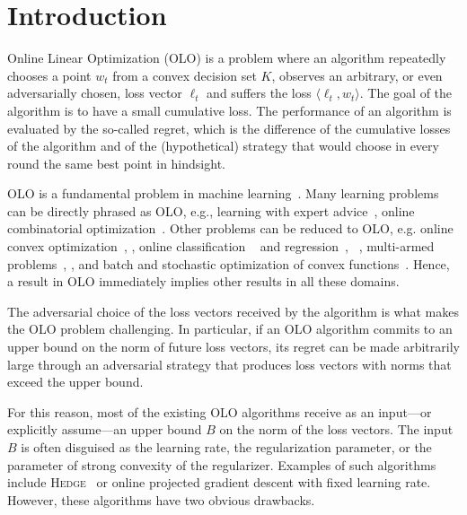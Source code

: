 \section{Introduction}
\label{section:introduction}

Online Linear Optimization (OLO) is a problem where an algorithm repeatedly
chooses a point $w_t$ from a convex decision set $K$, observes an arbitrary, or
even adversarially chosen, loss vector $\ell_t$ and suffers the loss $\langle
\ell_t, w_t \rangle$.  The goal of the algorithm is to have a small cumulative
loss. The performance of an algorithm is evaluated by the so-called regret,
which is the difference of the cumulative losses of the algorithm and of the
(hypothetical) strategy that would choose in every round the same best point in
hindsight.

OLO is a fundamental problem in machine
learning~\cite{Cesa-Bianchi-Lugosi-2006, Rakhlin-Sridharan-2009,
Shalev-Shwartz-2011}.  Many learning problems can be directly phrased as OLO,
e.g., learning with expert advice~\cite{Littlestone-Warmuth-1994, Vovk-1998,
Freund-Schapire-1997, Cesa-Bianchi-Haussler-Helmbold-Schapire-Warmuth-1997},
online combinatorial optimization~\cite{Kalai-Vempala-2005,
Helmbold-Warmuth-2009, Koolen-Warmuth-Kivinen-2010}. Other problems can be
reduced to OLO, e.g. online convex
optimization~\cite{Abernethy-Bartlett-Rakhlin-Tewari-2008},
\cite[Chapter~2]{Shalev-Shwartz-2011}, online classification
~\cite{Rosenblatt-1958, Freund-Schapire-1999} and
regression~\cite{Kivinen-Warmuth-1997},
~\cite[Chapters~11~and~12]{Cesa-Bianchi-Lugosi-2006}, multi-armed
problems~\cite[Chapter~6]{Cesa-Bianchi-Lugosi-2006},
\cite{Abernethy-Hazan-Rakhlin-2008, Bubeck-Cesa-Bianchi-2012}, and batch and
stochastic optimization of convex functions~\cite{Nemirovski-Yudin-1983,
Bubeck-2015}.  Hence, a result in OLO immediately implies other results in all
these domains.

The adversarial choice of the loss vectors received by the algorithm is what
makes the OLO problem challenging. In particular, if an OLO algorithm commits
to an upper bound on the norm of future loss vectors, its regret can be made
arbitrarily large through an adversarial strategy that produces loss vectors
with norms that exceed the upper bound.

For this reason, most of the existing OLO algorithms receive as an input---or
explicitly assume---an upper bound $B$ on the norm of the loss vectors.  The
input $B$ is often disguised as the learning rate, the regularization
parameter, or the parameter of strong convexity of the regularizer. Examples of
such algorithms include \textsc{Hedge}~\cite{Freund-Schapire-1997} or online
projected gradient descent with fixed learning rate.  However, these algorithms
have two obvious drawbacks.

